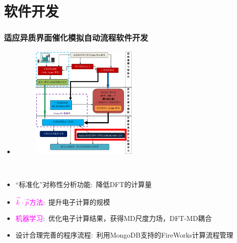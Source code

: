 \documentclass[cjk,slidestop,compress,mathserif,blue]{beamer}
\begin{document}
\section{软件开发}
\frame
{
	\frametitle{适应异质界面催化模拟自动流程软件开发}
\begin{minipage}[b]{0.47\linewidth}
	\begin{itemize}
		\item \fontsize{8.0pt}{4.2pt}\selectfont{适用于异质界面的高通量材料计算自动流程软件架构}
\begin{figure}[h!]
\centering
\hskip -35pt
\includegraphics[height=2.18in]{Figures/MP_comp_BCC.png}
\label{MP_comp_BCC}
\end{figure}
	\end{itemize}
\end{minipage}
~
\begin{minipage}[b]{0.42\linewidth}
\begin{itemize}
	\item “标准化”对称性分析功能:~降低\textrm{DFT}的计算量
	\item \textcolor{magenta}{$\vec k\cdot\vec p$方法}:~提升电子计算的规模%
	\item \textcolor{magenta}{机器学习}:~优化电子计算结果，获得\textrm{MD}尺度力场，\textrm{DFT-MD}耦合%
	\item 设计合理完善的程序流程:~利用\textrm{MongoDB}支持的\textrm{FireWorks}计算流程管理%
\end{itemize}
\end{minipage}
}
\end{document}
